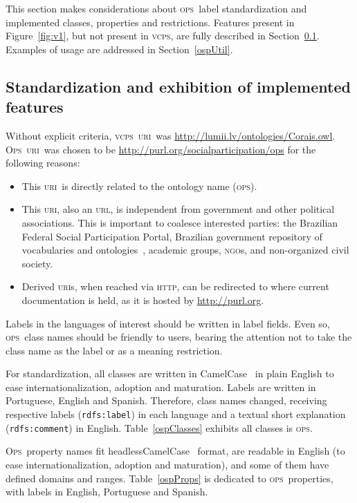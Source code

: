 \documentclass[10pt,letterpaper]{article}
\newcommand{\ops}{\textsc{ops}}
\newcommand{\opsi}{O\textsc{ps}}
\newcommand{\vcps}{\textsc{vcps}}
\newcommand{\uri}{\textsc{uri}}
\newcommand{\urll}{\textsc{url}}
\newcommand{\ngo}{\textsc{ngo}}
\newcommand{\http}{\textsc{http}}
\begin{document}
This section makes considerations about \ops\ label standardization and implemented classes, properties and restrictions. Features present in Figure~\ref{fig:v1}, but not present in \vcps, are fully described in Section~\ref{impl}. Examples of usage are addressed in Section~\ref{ospUtil}. 


\subsection{Standardization and exhibition of implemented features}\label{impl}
Without explicit criteria, \vcps\ \uri\ was \url{http://lumii.lv/ontologies/Corais.owl}. \opsi\ \uri\ was chosen to be \url{http://purl.org/socialparticipation/ops} for the following reasons:
\begin{itemize}
    \item This \uri\ is directly related to the ontology name (\ops).
    \item This \uri, also an \urll, is independent from government and other political associations. This is important to coalesce interested parties: the Brazilian Federal Social Participation Portal\cite{participa}, Brazilian government repository of vocabularies and ontologies~\cite{vocab}, academic groups,  \ngo s, and non-organized civil society.
    \item Derived \uri s, when reached via \http, can be redirected to where current documentation is held, as it is hosted by \url{http://purl.org}.
\end{itemize}

Labels in the languages of interest should be written in label fields. Even so, \ops\ class names should be friendly to users, bearing the attention not to take the class name as the label or as a meaning restriction.

For standardization, all classes are written in CamelCase~\cite{cc} in plain English to ease internationalization, adoption and maturation. Labels are written in Portuguese, English and Spanish. Therefore, class names changed, receiving respective labels (\texttt{rdfs:label}) in each language and a textual short explanation (\texttt{rdfs:comment}) in English. 
Table~\ref{ospClasses} exhibits all classes is \ops.

\opsi\ property names fit headlessCamelCase~\cite{cc} format, are readable in English (to ease internationalization, adoption and maturation), and some of them have defined domains and ranges. Table~\ref{ospProps} is dedicated to \ops\ properties, with labels in English, Portuguese and Spanish.
\end{document}
